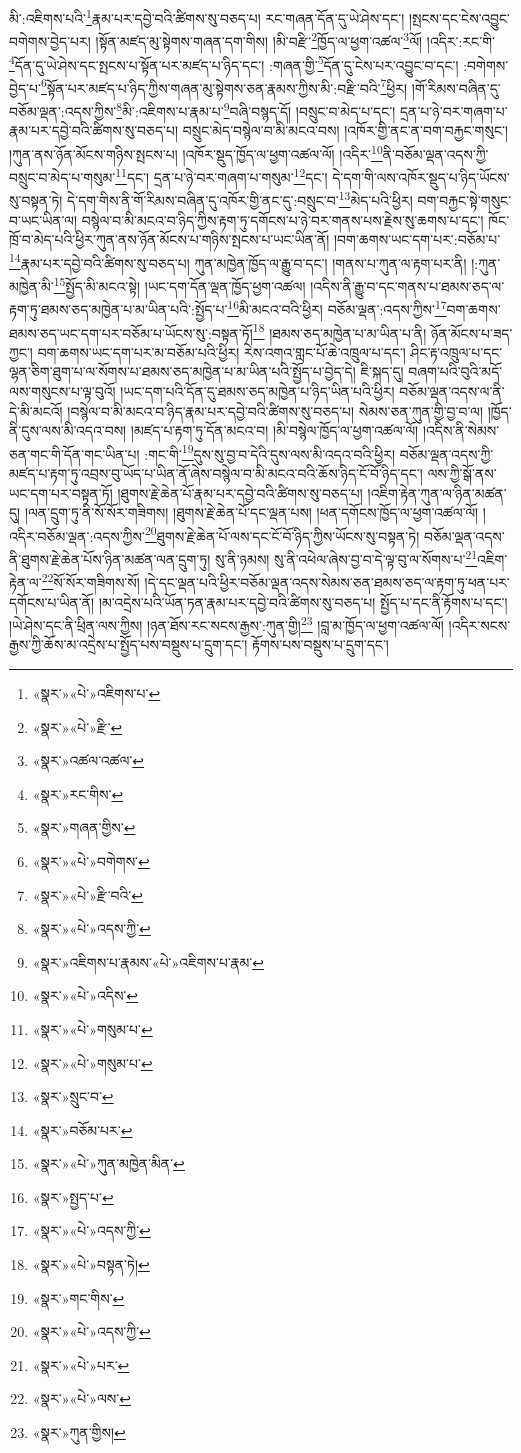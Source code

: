 མི་:འཇིགས་པའི་\footnote{«སྣར་»«པེ་»འཇིགས་པ་}རྣམ་པར་དབྱེ་བའི་ཚིགས་སུ་བཅད་པ། རང་གཞན་དོན་དུ་ཡེ་ཤེས་དང་། །སྤངས་དང་ངེས་འབྱུང་བགེགས་བྱེད་པར། །སྟོན་མཛད་མུ་སྟེགས་གཞན་དག་གིས། །མི་བརྫི་\footnote{«སྣར་»«པེ་»རྫི་}ཁྱོད་ལ་ཕྱག་འཚལ་\footnote{«སྣར་»འཚལ་འཚལ་}ལོ། །འདིར་:རང་གི་\footnote{«སྣར་»རང་གིས་}དོན་དུ་ཡེ་ཤེས་དང་སྤངས་པ་སྟོན་པར་མཛད་པ་ཉིད་དང་། :གཞན་གྱི་\footnote{«སྣར་»གཞན་གྱིས་}དོན་དུ་ངེས་པར་འབྱུང་བ་དང་། :བགེགས་བྱེད་པ་\footnote{«སྣར་»«པེ་»བགེགས་}སྟོན་པར་མཛད་པ་ཉིད་ཀྱིས་གཞན་མུ་སྟེགས་ཅན་རྣམས་ཀྱིས་མི་:བརྫི་བའི་\footnote{«སྣར་»«པེ་»རྫི་བའི་}ཕྱིར། །གོ་རིམས་བཞིན་དུ་བཅོམ་ལྡན་:འདས་ཀྱིས་\footnote{«སྣར་»«པེ་»འདས་ཀྱི་}མི་:འཇིགས་པ་རྣམ་པ་\footnote{«སྣར་»འཇིགས་པ་རྣམས་«པེ་»འཇིགས་པ་རྣམ་}བཞི་བསྙད་དོ། །བསྲུང་བ་མེད་པ་དང་། དྲན་པ་ཉེ་བར་གཞག་པ་རྣམ་པར་དབྱེ་བའི་ཚིགས་སུ་བཅད་པ། བསྲུང་མེད་བསྙེལ་བ་མི་མངའ་བས། །འཁོར་གྱི་ནང་ན་བག་བརྐྱང་གསུང་། །ཀུན་ནས་ཉོན་མོངས་གཉིས་སྤངས་པ། །འཁོར་སྡུད་ཁྱོད་ལ་ཕྱག་འཚལ་ལོ། །འདིར་\footnote{«སྣར་»«པེ་»འདིས་}ནི་བཅོམ་ལྡན་འདས་ཀྱི་བསྲུང་བ་མེད་པ་གསུམ་\footnote{«སྣར་»«པེ་»གསུམ་པ་}དང་། དྲན་པ་ཉེ་བར་གཞག་པ་གསུམ་\footnote{«སྣར་»«པེ་»གསུམ་པ་}དང་། དེ་དག་གི་ལས་འཁོར་སྡུད་པ་ཉིད་ཡོངས་སུ་བསྟན་ཏེ། དེ་དག་གིས་ནི་གོ་རིམས་བཞིན་དུ་འཁོར་གྱི་ནང་དུ་:བསྲུང་བ་\footnote{«སྣར་»སྲུང་བ་}མེད་པའི་ཕྱིར། བག་བརྐྱང་སྟེ་གསུང་བ་ཡང་ཡིན་ལ། བསྙེལ་བ་མི་མངའ་བ་ཉིད་ཀྱིས་རྟག་ཏུ་དགོངས་པ་ཉེ་བར་གནས་པས་རྗེས་སུ་ཆགས་པ་དང་། ཁོང་ཁྲོ་བ་མེད་པའི་ཕྱིར་ཀུན་ནས་ཉོན་མོངས་པ་གཉིས་སྤངས་པ་ཡང་ཡིན་ནོ། །བག་ཆགས་ཡང་དག་པར་:བཅོམ་པ་\footnote{«སྣར་»བཅོམ་པར་}རྣམ་པར་དབྱེ་བའི་ཚིགས་སུ་བཅད་པ། ཀུན་མཁྱེན་ཁྱོད་ལ་རྒྱུ་བ་དང་། །གནས་པ་ཀུན་ལ་རྟག་པར་ནི། །:ཀུན་མཁྱེན་མི་\footnote{«སྣར་»«པེ་»ཀུན་མཁྱེན་མིན་}སྤྱོད་མི་མངའ་སྟེ། །ཡང་དག་དོན་ལྡན་ཁྱོད་ཕྱག་འཚལ། །འདིས་ནི་རྒྱུ་བ་དང་གནས་པ་ཐམས་ཅད་ལ་རྟག་ཏུ་ཐམས་ཅད་མཁྱེན་པ་མ་ཡིན་པའི་:སྤྱོད་པ་\footnote{«སྣར་»སྤྱད་པ་}མི་མངའ་བའི་ཕྱིར། བཅོམ་ལྡན་:འདས་ཀྱིས་\footnote{«སྣར་»«པེ་»འདས་ཀྱི་}བག་ཆགས་ཐམས་ཅད་ཡང་དག་པར་བཅོམ་པ་ཡོངས་སུ་:བསྟན་ཏོ།\footnote{«སྣར་»«པེ་»བསྟན་ཏེ།} །ཐམས་ཅད་མཁྱེན་པ་མ་ཡིན་པ་ནི། ཉོན་མོངས་པ་ཟད་ཀྱང་། བག་ཆགས་ཡང་དག་པར་མ་བཅོམ་པའི་ཕྱིར། རེས་འགའ་གླང་པོ་ཆེ་འཁྲུལ་པ་དང་། ཤིང་རྟ་འཁྲུལ་པ་དང་ལྷན་ཅིག་ཐུག་པ་ལ་སོགས་པ་ཐམས་ཅད་མཁྱེན་པ་མ་ཡིན་པའི་སྤྱོད་པ་བྱེད་དེ། ཇི་སྐད་དུ། བཞག་པའི་བུའི་མདོ་ལས་གསུངས་པ་ལྟ་བུའོ། །ཡང་དག་པའི་དོན་དུ་ཐམས་ཅད་མཁྱེན་པ་ཉིད་ཡིན་པའི་ཕྱིར། བཅོམ་ལྡན་འདས་ལ་ནི་དེ་མི་མངའོ། །བསྙེལ་བ་མི་མངའ་བ་ཉིད་རྣམ་པར་དབྱེ་བའི་ཚིགས་སུ་བཅད་པ། སེམས་ཅན་ཀུན་གྱི་བྱ་བ་ལ། །ཁྱོད་ནི་དུས་ལས་མི་འདའ་བས། །མཛད་པ་རྟག་ཏུ་དོན་མངའ་བ། །མི་བསྙེལ་ཁྱོད་ལ་ཕྱག་འཚལ་ལོ། །འདིས་ནི་སེམས་ཅན་གང་གི་དོན་གང་ཡིན་པ། :གང་གི་\footnote{«སྣར་»གང་གིས་}དུས་སུ་བྱ་བ་དེའི་དུས་ལས་མི་འདའ་བའི་ཕྱིར། བཅོམ་ལྡན་འདས་ཀྱི་མཛད་པ་རྟག་ཏུ་འབྲས་བུ་ཡོད་པ་ཡིན་ནོ་ཞེས་བསྙེལ་བ་མི་མངའ་བའི་ཆོས་ཉིད་ངོ་བོ་ཉིད་དང་། ལས་ཀྱི་སྒོ་ནས་ཡང་དག་པར་བསྟན་ཏོ། །ཐུགས་རྗེ་ཆེན་པོ་རྣམ་པར་དབྱེ་བའི་ཚིགས་སུ་བཅད་པ། །འཇིག་རྟེན་ཀུན་ལ་ཉིན་མཚན་དུ། །ལན་དྲུག་ཏུ་ནི་སོ་སོར་གཟིགས། །ཐུགས་རྗེ་ཆེན་པོ་དང་ལྡན་པས། །ཕན་དགོངས་ཁྱོད་ལ་ཕྱག་འཚལ་ལོ། །འདིར་བཅོམ་ལྡན་:འདས་ཀྱིས་\footnote{«སྣར་»«པེ་»འདས་ཀྱི་}ཐུགས་རྗེ་ཆེན་པོ་ལས་དང་ངོ་བོ་ཉིད་ཀྱིས་ཡོངས་སུ་བསྟན་ཏེ། བཅོམ་ལྡན་འདས་ནི་ཐུགས་རྗེ་ཆེན་པོས་ཉིན་མཚན་ལན་དྲུག་ཏུ། སུ་ནི་ཉམས། སུ་ནི་འཕེལ་ཞེས་བྱ་བ་དེ་ལྟ་བུ་ལ་སོགས་པ་\footnote{«སྣར་»«པེ་»པར་}འཇིག་རྟེན་ལ་\footnote{«སྣར་»«པེ་»ལས་}སོ་སོར་གཟིགས་སོ། །དེ་དང་ལྡན་པའི་ཕྱིར་བཅོམ་ལྡན་འདས་སེམས་ཅན་ཐམས་ཅད་ལ་རྟག་ཏུ་ཕན་པར་དགོངས་པ་ཡིན་ནོ། །མ་འདྲེས་པའི་ཡོན་ཏན་རྣམ་པར་དབྱེ་བའི་ཚིགས་སུ་བཅད་པ། སྤྱོད་པ་དང་ནི་རྟོགས་པ་དང་། །ཡེ་ཤེས་དང་ནི་ཕྲིན་ལས་ཀྱིས། །ཉན་ཐོས་རང་སངས་རྒྱས་:ཀུན་གྱི།\footnote{«སྣར་»ཀུན་གྱིས།} །བླ་མ་ཁྱོད་ལ་ཕྱག་འཚལ་ལོ། །འདིར་སངས་རྒྱས་ཀྱི་ཆོས་མ་འདྲེས་པ་སྤྱོད་པས་བསྡུས་པ་དྲུག་དང་། རྟོགས་པས་བསྡུས་པ་དྲུག་དང་། 